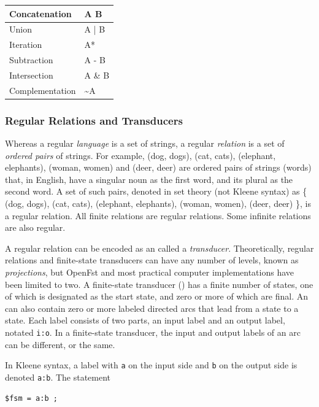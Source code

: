 \vspace{4mm}

\begin{tabular}{|l|l|}
\hline
Concatenation 	& A B \\
\hline
Union         	& A | B \\
\hline
Iteration	  	& A*\\
\hline
Subtraction		& A - B\\
\hline
Intersection	& A \& B\\
\hline
Complementation		& \~{}A\\
\hline
\end{tabular}

\subsubsection{Regular Relations and Transducers}

Whereas a regular \emph{language} is a set of strings, a regular \emph{relation}
is a set of
\emph{ordered pairs}
of strings.  For example, (dog, dogs), (cat, cats), (elephant, elephants), (woman, women)
and (deer, deer)
are ordered pairs of strings (words) that, in English, have a singular noun as the first word, and its plural
as the second word.  A set of such pairs, denoted in set theory (not Kleene syntax) as \{ (dog, dogs), (cat, cats), (elephant,
elephants), (woman, women), (deer, deer) \}, is a regular relation.  All finite relations are
regular relations.  Some infinite relations are also regular.

A regular relation can be encoded as an \fsm{} called a \emph{transducer}.  Theoretically,
regular relations and finite-state transducers can have any number of levels, known as
\emph{projections}, but OpenFst and most practical computer implementations have been limited to two.
A finite-state transducer (\fst{}) has a finite number of states, one of which is
designated as the start state, and zero or more of which are final.  An \fst{} can also
contain zero or more labeled directed arcs that lead from a state to a state.  Each label
consists of two parts, an input label and an output label, notated  \verb!i:o!.  In a finite-state
transducer, the input
and output labels of an arc can be different, or the same.

In Kleene syntax, a label with \texttt{a} on the input side and \texttt{b} on the output
side is denoted \texttt{a:b}.  The statement


\begin{Verbatim}
$fsm = a:b ;
\end{Verbatim}

